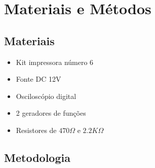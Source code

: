 \section{Materiais e Métodos}

\subsection{Materiais}


\begin{itemize}
\item Kit impressora número 6
\item Fonte DC 12V
\item Osciloscópio digital
\item 2 geradores de funções
\item Resistores de $470\Omega$ e $2.2K\Omega$
\end{itemize}

\subsection{Metodologia}

